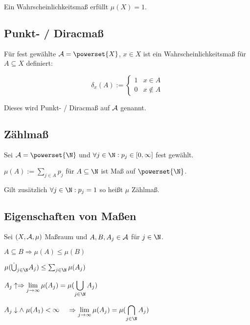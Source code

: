 Ein Wahrscheinlichkeitsmaß erfüllt $\mu(X) = 1$.

\subsection*{Punkt- / Diracmaß}

Für fest gewählte $\A = \powerset{X}$, $x \in X$ ist ein Wahrscheinlichkeitsmaß für $A \subseteq X$ definiert:

$$\delta_x(A) := \begin{cases}
	1 & x \in A \\
	0 & x \notin A
\end{cases}$$

Dieses wird Punkt- / Diracmaß auf $\mathcal{A}$ genannt.

\subsection*{Zählmaß}

Sei $\A = \powerset{\N}$ und $\forall j \in \N : p_j \in [0, \infty]$ fest gewählt.

$\mu(A) := \sum_{j\in A} p_j$ für $A \subseteq \N$ ist Maß auf $\powerset{\N}$.

Gilt zusätzlich $\forall j \in \N : p_j = 1$ so heißt $\mu$ Zählmaß.

\subsection*{Eigenschaften von Maßen}

Sei $(X, \mathcal{A}, \mu)$ Maßraum und $A, B, A_j \in \mathcal{A}$ für $j \in \N$.

\begin{description}[leftmargin=!,labelwidth=26mm]
	\item[Monotonie] $A \subseteq B \Rightarrow \mu(A) \leq \mu(B)$
	\item[$\sigma$-Subadditivität] $\mu(\dot\bigcup_{j\in \N} A_j) \leq \sum_{j\in \N} \mu(A_j)$
	\item[Stetigkeit (unten)] $A_j \uparrow \Rightarrow \displaystyle\lim_{j\to \infty} \mu(A_j) = \mu(\bigcup_{j\in \N} A_j)$
	\item[Stetigkeit (oben)] $A_j \downarrow \land \hspace*{1mm} \mu(A_1) < \infty \\ \hspace*{4mm}\Rightarrow \displaystyle\lim_{j\to \infty} \mu(A_j) = \mu(\bigcap_{j\in \N} A_j)$
\end{description}

